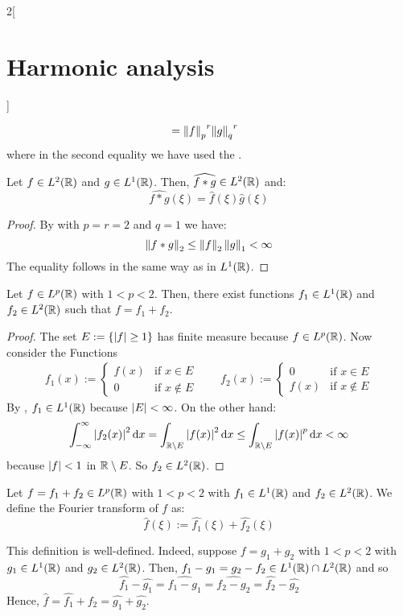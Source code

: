 \documentclass[../../../main_math.tex]{subfiles}
\begin{document}
\begin{multicols}{2}[\section{Harmonic analysis}]
\begin{sproof}
\begin{align*}
                       & ={\left\|f\right\|_p}^{r}{\left\|g\right\|_q}^{r}
    \end{align*}
    where in the second equality we have used the .
  \end{sproof}
  \begin{theorem}
    Let $f\in L^2(\mathbb{R})$ and $g\in L^1(\mathbb{R})$. Then, $\widehat{f*g}\in L^2(\mathbb{R})$ and:$$\widehat{f*g}(\xi)=\widehat{f}(\xi)\widehat{g}(\xi)$$
  \end{theorem}
  \begin{proof}
    By  with $p=r=2$ and $q=1$ we have:
    $$\left\|f*g\right\|_2\leq\left\|f\right\|_2\left\|g\right\|_1<\infty$$
    The equality follows in the same way as in $L^1(\mathbb{R})$.
  \end{proof}
  \begin{lemma}
    Let $f\in L^p(\mathbb{R})$ with $1<p<2$. Then, there exist functions $f_1\in L^1(\mathbb{R})$ and $f_2\in L^2(\mathbb{R})$ such that $f=f_1+f_2$.
  \end{lemma}
  \begin{proof}
    The set $E:=\{\abs{f}\geq 1\}$ has finite measure because $f\in L^p(\mathbb{R})$. Now consider the Functions
    \begin{gather*}
      f_1(x):=\begin{cases}
        f(x) & \text{if }x\in E    \\
        0    & \text{if }x\notin E
      \end{cases}\qquad
      f_2(x):=\begin{cases}
        0    & \text{if }x\in E    \\
        f(x) & \text{if }x\notin E
      \end{cases}
    \end{gather*}
    By , $f_1\in L^1(\mathbb{R})$ because $\m{E}<\infty$. On the other hand: $$\int_{-\infty}^{\infty}\abs{f_2(x)}^2\dd{x}=\int_{\mathbb{R}\setminus E}\abs{f(x)}^2\dd{x}\leq \int_{\mathbb{R}\setminus E}\abs{f(x)}^p\dd{x}<\infty$$
    because $\abs{f}<1$ in $\mathbb{R}\setminus E$.
    So $f_2\in L^2(\mathbb{R})$.
  \end{proof}
  \begin{definition}
    Let $f=f_1+f_2\in L^p(\mathbb{R})$ with $1<p<2$ with $f_1\in L^1(\mathbb{R})$ and $f_2\in L^2(\mathbb{R})$. We define the Fourier transform of $f$ as:
    $$\widehat{f}(\xi):=\widehat{f_1}(\xi)+\widehat{f_2}(\xi)$$
  \end{definition}
  \begin{remark}
    This definition is well-defined. Indeed, suppose $f=g_1+g_2$ with $1<p<2$ with $g_1\in L^1(\mathbb{R})$ and $g_2\in L^2(\mathbb{R})$. Then, $f_1-g_1=g_2-f_2\in L^1(\mathbb{R})\cap L^2(\mathbb{R})$ and so $$\widehat{f_1}-\widehat{g_1}=\widehat{f_1-g_1}=\widehat{f_2-g_2}=\widehat{f_2}-\widehat{g_2}$$
    Hence, $\widehat{f}=\widehat{f_1}+\widehat{f_2}=\widehat{g_1}+\widehat{g_2}$.
  \end{remark}

\end{multicols}
\end{document}
